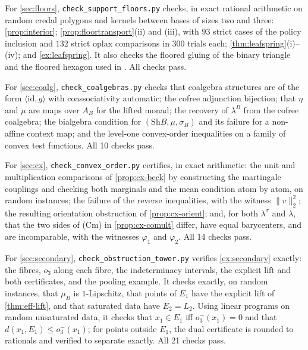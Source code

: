 \documentclass[11pt]{article}
\theoremstyle{definition}
\theoremstyle{remark}
\newcommand{\Sh}{\mathrm{Sh}}
\newcommand{\id}{\mathrm{id}}
\newcommand{\lb}{\bar\lambda}
\newcommand{\ls}{\lambda^{\sigma}}
\begin{document}
For \cref{sec:floors}, \texttt{check\_support\_floors.py} checks, in exact rational arithmetic on random credal polygons and
kernels between bases of sizes two and three: \cref{prop:interior}; \cref{prop:floortransport}(ii) and (iii), with $93$ strict
cases of the policy inclusion and $132$ strict oplax comparisons in $300$ trials each; \cref{thm:leafspring}(i)--(iv); and
\cref{ex:leafspring}. It also checks the floored gluing of the binary triangle and the floored hexagon used in
\cite{Conditionals,Awasthi-Family}. All checks pass.

For \cref{sec:coalg}, \texttt{check\_coalgebras.py} checks that coalgebra structures are of the form
$\langle\id,g\rangle$ with coassociativity automatic; the cofree adjunction bijection; that $\eta$ and
$\mu$ are maps over $A_B$ for the lifted monad; the recovery of $\lambda^B$ from the cofree coalgebra;
the bialgebra condition for $(\Sh B,\mu,\sigma_B)$ and its failure for a non-affine context map; and
the level-one convex-order inequalities on a family of convex test functions. All 10 checks pass.

For \cref{sec:cx}, \texttt{check\_convex\_order.py} certifies, in exact arithmetic: the unit and
multiplication comparisons of \cref{prop:cx-beck} by constructing the martingale couplings and checking
both marginals and the mean condition atom by atom, on random instances; the failure of the reverse
inequalities, with the witness $\lVert v\rVert_2^2$; the resulting orientation obstruction of
\cref{prop:cx-orient}; and, for both $\ls$ and $\lb$, that the two sides of (Cm) in
\cref{prop:cx-comult} differ, have equal barycenters, and are incomparable, with the witnesses
$\varphi_1$ and $\varphi_2$. All 14 checks pass.

For \cref{sec:secondary}, \texttt{check\_obstruction\_tower.py} verifies \cref{ex:secondary} exactly:
the fibres, $o_3$ along each fibre, the indeterminacy intervals, the explicit lift and both
certificates, and the pooling example. It checks exactly, on random instances, that $\mu_B$ is
$1$-Lipschitz, that points of $E_1$ have the explicit lift of \cref{thm:eff-lift}, and that saturated
data have $E_2=L_2$. Using linear programs on random unsaturated data, it checks that $x_1\in E_1$ iff
$o_3^-(x_1)=0$ and that $d(x_1,E_1)\le o_3^-(x_1)$; for points outside $E_1$, the dual certificate is
rounded to rationals and verified to separate exactly. All 21 checks pass.
\end{document}
